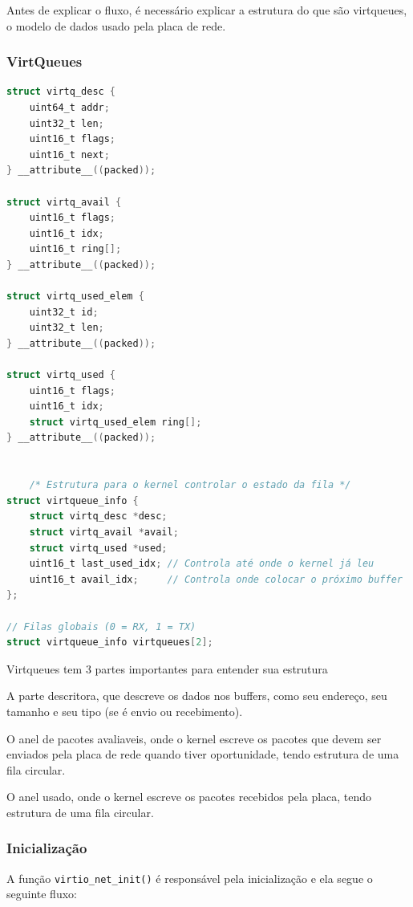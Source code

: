     Antes de explicar o fluxo, é necessário explicar a estrutura do que são virtqueues, o modelo de dados usado pela placa de rede.

\subsubsection{VirtQueues}

\begin{lstlisting}[language=C]
struct virtq_desc {
    uint64_t addr;
    uint32_t len;
    uint16_t flags;
    uint16_t next;
} __attribute__((packed));

struct virtq_avail {
    uint16_t flags;
    uint16_t idx;
    uint16_t ring[];
} __attribute__((packed));

struct virtq_used_elem {
    uint32_t id;
    uint32_t len;
} __attribute__((packed));

struct virtq_used {
    uint16_t flags;
    uint16_t idx;
    struct virtq_used_elem ring[];
} __attribute__((packed));


    /* Estrutura para o kernel controlar o estado da fila */
struct virtqueue_info {
    struct virtq_desc *desc;
    struct virtq_avail *avail;
    struct virtq_used *used;
    uint16_t last_used_idx; // Controla até onde o kernel já leu
    uint16_t avail_idx;     // Controla onde colocar o próximo buffer 
};

// Filas globais (0 = RX, 1 = TX)
struct virtqueue_info virtqueues[2];
\end{lstlisting}

Virtqueues tem 3 partes importantes para entender sua estrutura

A parte descritora, que descreve os dados nos buffers, como seu endereço, seu tamanho e seu tipo (se é envio ou recebimento).

O anel de pacotes avaliaveis, onde o kernel escreve os pacotes que devem ser enviados pela placa de rede quando tiver oportunidade, tendo estrutura de uma fila circular.

O anel usado, onde o kernel escreve os pacotes recebidos pela placa, tendo estrutura de uma fila circular.


\subsubsection{Inicialização}

A função \texttt{virtio\_net\_init()} é responsável pela inicialização e ela segue o seguinte fluxo:

